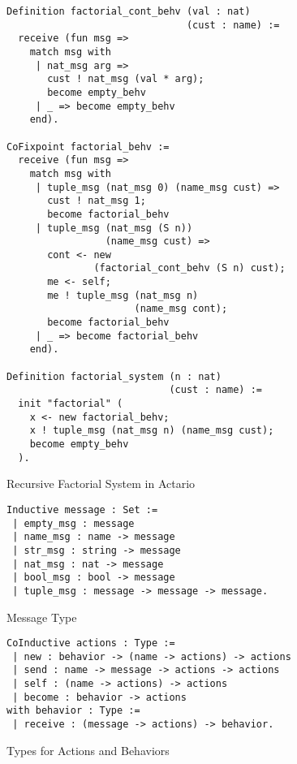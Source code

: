 \begin{figure}
\begin{lstlisting}[style=small]
Definition factorial_cont_behv (val : nat)
                               (cust : name) :=
  receive (fun msg =>
    match msg with
     | nat_msg arg =>
       cust ! nat_msg (val * arg);
       become empty_behv
     | _ => become empty_behv
    end).

CoFixpoint factorial_behv :=
  receive (fun msg =>
    match msg with
     | tuple_msg (nat_msg 0) (name_msg cust) =>
       cust ! nat_msg 1;
       become factorial_behv
     | tuple_msg (nat_msg (S n))
                 (name_msg cust) =>
       cont <- new
               (factorial_cont_behv (S n) cust);
       me <- self;
       me ! tuple_msg (nat_msg n)
                      (name_msg cont);
       become factorial_behv
     | _ => become factorial_behv
    end).

Definition factorial_system (n : nat)
                            (cust : name) :=
  init "factorial" (
    x <- new factorial_behv;
    x ! tuple_msg (nat_msg n) (name_msg cust);
    become empty_behv
  ).
\end{lstlisting}
\caption{Recursive Factorial System in Actario}\label{coq:fact}
\end{figure}



\begin{figure}
\begin{lstlisting}
Inductive message : Set :=
 | empty_msg : message
 | name_msg : name -> message
 | str_msg : string -> message
 | nat_msg : nat -> message
 | bool_msg : bool -> message
 | tuple_msg : message -> message -> message.
\end{lstlisting}
\caption{Message Type}\label{coq:message}
\hspace*{1em}
\begin{lstlisting}
CoInductive actions : Type :=
 | new : behavior -> (name -> actions) -> actions
 | send : name -> message -> actions -> actions
 | self : (name -> actions) -> actions
 | become : behavior -> actions
with behavior : Type :=
 | receive : (message -> actions) -> behavior.
\end{lstlisting}
\caption{Types for Actions and Behaviors}\label{coq:actions}
\end{figure}

